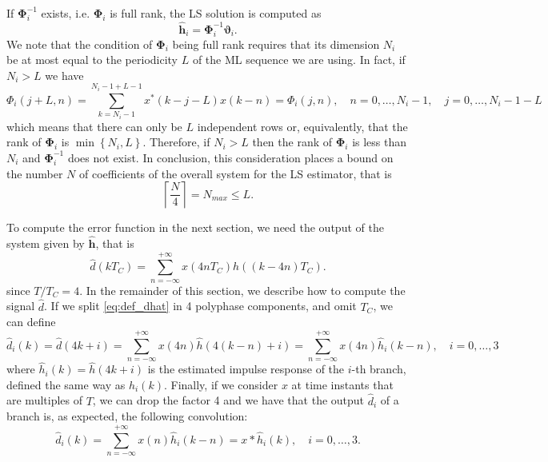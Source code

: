 \documentclass[10pt]{article}
\begin{document}
If $\mathbf{\Phi}_i^{-1}$ exists, i.e. $\mathbf{\Phi}_i$ is full rank, the LS solution is computed as
\begin{equation}
	\mathbf{\hat{h}}_i = \mathbf{\Phi}_i^{-1} \boldsymbol\vartheta_i.
\end{equation}
We note that the condition of $\mathbf{\Phi}_i$ being full rank requires that its dimension $N_i$ be at most equal to the periodicity $L$ of the ML sequence we are using. In fact, if $N_i > L$ we have
\begin{equation}
	\Phi_i(j+L, n) = \sum_{k=N_i-1}^{N_i-1+L-1} x^*(k-j-L)x(k-n) = \Phi_i(j, n), \quad n=0,\ldots,N_i-1, \quad j = 0,\ldots,N_i-1-L
\end{equation}
which means that there can only be $L$ independent rows or, equivalently, that the rank of $\mathbf{\Phi}_i$ is $\min \left\lbrace N_i, L \right\rbrace$. Therefore, if $N_i > L$ then the rank of $\mathbf{\Phi}_i$ is less than $N_i$ and $\mathbf{\Phi}_i^{-1}$ does not exist. In conclusion, this consideration places a bound on the number $N$ of coefficients of the overall system for the LS estimator, that is
\begin{equation}
	\left\lceil\frac{N}{4}\right\rceil = N_{max} \leq L.
\end{equation}

To compute the error function in the next section, we need the output of the system given by $\hat{\mathbf{h}}$, that is
\begin{equation}\label{eq:def_dhat}
	\hat{d}(kT_C) = \sum_{n=-\infty}^{+\infty} x(4nT_C)\hat{h}((k-4n)T_C).
\end{equation}
since $T/T_C=4$. In the remainder of this section, we describe how to compute the signal $\hat{d}$. If we split \eqref{eq:def_dhat} in 4 polyphase components, and omit $T_C$, we can define
\begin{equation}
	\hat{d}_i(k) = \hat{d}(4k+i) = \sum_{n=-\infty}^{+\infty} x(4n)\hat{h}(4(k-n)+i) = \sum_{n=-\infty}^{+\infty} x(4n)\hat{h}_i(k-n),\quad i=0,\ldots,3
\end{equation}
where $\hat{h}_i(k) = \hat{h}(4k+i)$ is the estimated impulse response of the $i$-th branch, defined the same way as $h_i(k)$. Finally, if we consider $x$ at time instants that are multiples of $T$, we can drop the factor 4 and we have that the output $\hat{d}_i$ of a branch is, as expected, the following convolution:
\begin{equation}
	\hat{d}_i(k) = \sum_{n=-\infty}^{+\infty} x(n)\hat{h}_i(k-n) = x \ast \hat{h}_i (k) ,\quad i=0,\ldots,3.
\end{equation}
\end{document}
